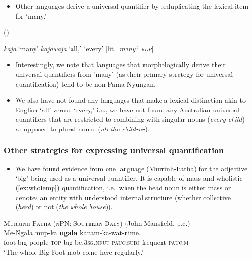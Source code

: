 \documentclass{article}
\begin{document}
\begin{itemize}
\item Other languages derive a universal quantifier by reduplicating the lexical item for `many.'
\end{itemize}

\begin{exe}
   (\citealt[54]{mushin12})
  \begin{xlist}
    \ex \textit{kaja} `many'
    \ex \textit{kajawaja}  `all,' `every' [lit.\ \textit{many\char`~\textsc{rdp}}]
  \end{xlist}
\end{exe}


\begin{itemize}
\item Interestingly, we note that languages that morphologically derive their universal quantifiers from `many' (as their primary strategy for universal quantification) tend to be non-Pama-Nyungan.
\item We also have not found any languages that make a lexical distinction akin to English `all' versus `every,' i.e., we have not found any Australian universal quantifiers that are restricted to combining with singular nouns ({\it every child}) as opposed to plural nouns ({\it all the children}).
\end{itemize}

\subsubsection{Other strategies for expressing universal quantification
  \label{sec:uqbig}}

\begin{itemize}
\item We have found evidence from one language (Murrinh-Patha) for the adjective `big' being used as a universal quantifier. It is capable of mass and wholistic (\ref{ex:wholemp}) quantification, i.e.\ when the head noun is either mass or denotes an entity with understood internal structure (whether collective (\textit{herd}) or not (\textit{the whole house})).
\end{itemize}
\begin{exe}
  \ex\label{ex:wholemp} \textsc{Murrinh-Patha (nPN: Southern Daly)} (John Mansfield, p.c.)\\
  \gll Me-Ngala mup-ka     \textbf{ngala} kanam-ka-wat-nime.\\
  foot-big  people-\textsc{top} big  be.\textsc{3sg.nfut-pauc.subj}-frequent-\textsc{pauc.m}\\
  \glt `The whole Big Foot mob come here regularly.' %
\end{exe}
\end{document}
